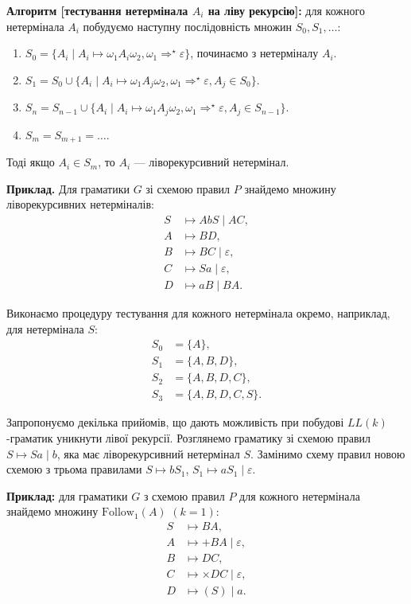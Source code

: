 \textbf{Алгоритм [тестування нетермінала $A_i$ на ліву рекурсію]:} для кожного нетермінала $A_i$ побудуємо наступну послідовність множин $S_0, S_1, \ldots$:
\begin{enumerate}
	\item $S_0 = \{A_i \mid A_i \mapsto \omega_1 A_i \omega_2, \omega_1 \Rightarrow^\star \varepsilon \}$, починаємо з нетерміналу $A_i$.
	\item $S_1 = S_0 \cup \{ A_i \mid A_i \mapsto \omega_1 A_j \omega_2, \omega_1 \Rightarrow^\star \varepsilon, A_j \in S_0\}$.
	\item $S_n = S_{n-1} \cup \{ A_i \mid A_i \mapsto \omega_1 A_j \omega_2, \omega_1 \Rightarrow^\star \varepsilon, A_j \in S_{n-1}\}$.
	\item $S_m = S_{m + 1} = \ldots$.
\end{enumerate}

Тоді якщо $A_i \in S_m$, то $A_i$ --- ліворекурсивний нетермінал.\medskip

\textbf{Приклад.} Для граматики $G$ зі схемою правил $P$ знайдемо множину ліворекурсивних нетерміналів:
\begin{align*}
S &\mapsto AbS \mid AC, \\
A &\mapsto BD, \\
B &\mapsto BC \mid \varepsilon, \\
C &\mapsto Sa \mid \varepsilon, \\
D &\mapsto aB \mid BA.
\end{align*}

Виконаємо процедуру тестування для кожного нетермінала окремо, наприклад, для нетермінала $S$: 
\begin{align*}
S_0 &= \{A\}, \\
S_1 &= \{A, B, D\}, \\
S_2 &= \{A, B, D, C\}, \\
S_3 &= \{A, B, D, C, S\}.
\end{align*}

Запропонуємо декілька прийомів, що дають можливість при побудові $LL(k)$-граматик уникнути лівої рекурсії. Розглянемо граматику зі схемою правил $S \mapsto Sa \mid b$, яка має ліворекурсивний нетермінал $S$. Замінимо схему правил новою схемою з трьома правилами $S \mapsto bS_1$, $S_1 \mapsto aS_1 \mid \varepsilon$. \medskip

\textbf{Приклад:} для граматики $G$ з схемою правил $P$ для кожного нетермінала знайдемо множину $\text{Follow}_1(A)$ $(k=1)$:
\begin{align*}
	S &\mapsto BA, \\
	A &\mapsto +BA \mid \varepsilon, \\
	B &\mapsto DC, \\
	C &\mapsto \times DC \mid \varepsilon, \\
	D &\mapsto (S) \mid a.
\end{align*}

